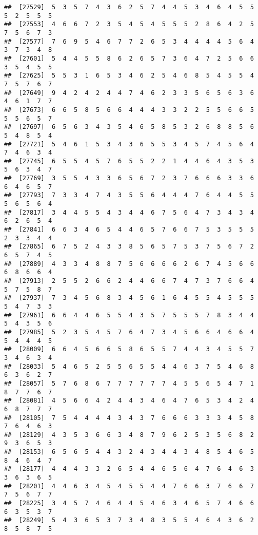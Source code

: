 \documentclass[
]{book}
\begin{document}
\begin{verbatim}
##  [27529]  5  3  5  7  4  3  6  2  5  7  4  4  5  3  4  6  4  5  5  5  2  5  5  5
##  [27553]  4  6  6  7  2  3  5  4  5  4  5  5  5  2  8  6  4  2  5  7  5  6  7  3
##  [27577]  7  6  9  5  4  6  7  7  2  6  5  3  4  4  4  4  5  6  4  3  7  3  4  8
##  [27601]  5  4  4  5  5  8  6  2  6  5  7  3  6  4  7  2  5  6  6  3  5  4  5  5
##  [27625]  5  5  3  1  6  5  3  4  6  2  5  4  6  8  5  4  5  5  4  7  5  7  6  7
##  [27649]  9  4  2  4  2  4  4  7  4  6  2  3  3  5  6  5  6  3  6  4  6  1  7  7
##  [27673]  6  6  5  8  5  6  6  4  4  4  3  3  2  2  5  5  6  6  5  5  5  6  5  7
##  [27697]  6  5  6  3  4  3  5  4  6  5  8  5  3  2  6  8  8  5  6  5  4  8  5  4
##  [27721]  5  4  6  1  5  3  4  3  6  5  5  3  4  5  7  4  5  6  4  7  4  6  3  4
##  [27745]  6  5  5  4  5  7  6  5  5  2  2  1  4  4  6  4  3  5  3  5  6  3  4  7
##  [27769]  3  5  5  4  3  3  6  5  6  7  2  3  7  6  6  6  3  3  6  6  4  6  5  7
##  [27793]  7  3  3  4  7  4  3  5  5  6  4  4  4  7  6  4  4  5  5  5  6  5  6  4
##  [27817]  3  4  4  5  5  4  3  4  4  6  7  5  6  4  7  3  4  3  4  6  2  6  5  4
##  [27841]  6  6  3  4  6  5  4  4  6  5  7  6  6  7  5  3  5  5  5  2  3  3  4  4
##  [27865]  6  7  5  2  4  3  3  8  5  6  5  7  5  3  7  5  6  7  2  6  5  7  4  5
##  [27889]  4  3  3  4  8  8  7  5  6  6  6  6  2  6  7  4  5  6  6  6  8  6  6  4
##  [27913]  2  5  5  2  6  6  2  4  4  6  6  7  4  7  3  7  6  6  4  5  7  5  8  7
##  [27937]  7  3  4  5  6  8  3  4  5  6  1  6  4  5  5  4  5  5  5  5  4  7  3  3
##  [27961]  6  6  4  4  6  5  5  4  3  5  7  5  5  5  7  8  3  4  4  5  4  3  5  6
##  [27985]  5  2  3  5  4  5  7  6  4  7  3  4  5  6  6  4  6  6  4  5  4  4  4  5
##  [28009]  6  6  4  5  6  6  5  8  6  5  5  7  4  4  3  4  5  5  7  3  4  6  3  4
##  [28033]  5  4  6  5  2  5  5  6  5  5  4  4  6  3  7  5  4  6  8  6  3  6  2  7
##  [28057]  5  7  6  8  6  7  7  7  7  7  7  4  5  5  6  5  4  7  1  8  7  7  6  7
##  [28081]  4  5  6  6  4  2  4  4  3  4  6  4  7  6  5  3  4  2  4  6  8  7  7  7
##  [28105]  7  5  4  4  4  4  3  4  3  7  6  6  6  3  3  3  4  5  8  7  6  4  6  3
##  [28129]  4  3  5  3  6  6  3  4  8  7  9  6  2  5  3  5  6  8  2  9  3  6  5  3
##  [28153]  6  5  6  5  4  4  3  2  4  3  4  4  3  4  8  5  4  6  5  8  4  6  4  7
##  [28177]  4  4  4  3  3  2  6  5  4  4  6  5  6  4  7  6  4  6  3  3  6  3  6  5
##  [28201]  4  4  6  3  4  5  4  5  5  4  4  7  6  6  3  7  6  6  7  7  5  6  7  7
##  [28225]  3  4  5  7  4  6  4  4  5  4  6  3  4  6  5  7  4  6  6  6  3  5  3  7
##  [28249]  5  4  3  6  5  3  7  3  4  8  3  5  5  4  6  4  3  6  2  8  5  8  7  5

\end{verbatim}
\end{document}
